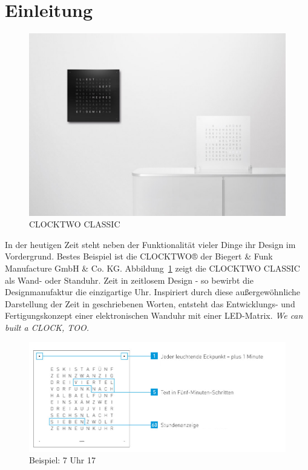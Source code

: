 
\section{Einleitung}
\label{sec:Einleitung}

\begin{figure}[t]
    \centering
    \includegraphics[width=13cm]{Abbildungen/29}
    \caption[ClockTwo]{CLOCKTWO CLASSIC}
    \label{fig:ClockTwo}
\end{figure}
%
 In der heutigen Zeit steht neben der Funktionalität vieler Dinge ihr Design im Vordergrund. Bestes Beispiel ist die CLOCKTWO® der Biegert \&  Funk Manufacture GmbH \& Co. KG. Abbildung~\ref{fig:ClockTwo} zeigt die CLOCKTWO CLASSIC als Wand- oder Standuhr. %
 Zeit in zeitlosem Design -   so bewirbt die Designmanufaktur die einzigartige Uhr.  Inspiriert durch diese außergewöhnliche Darstellung der Zeit in geschriebenen Worten, entsteht das Entwicklungs- und Fertigungskonzept einer elektronischen Wanduhr mit einer LED-Matrix. \textit{We can built a CLOCK, TOO.}
\begin{figure}[h]
    \centering
    \includegraphics[width=13cm]{Abbildungen/Uhrzeit_Beispiel}
    \caption[Uhrzeit_Bspl]{Beispiel: 7 Uhr 17}
    \label{fig:Uhrzeit_Bspl}
\end{figure}
